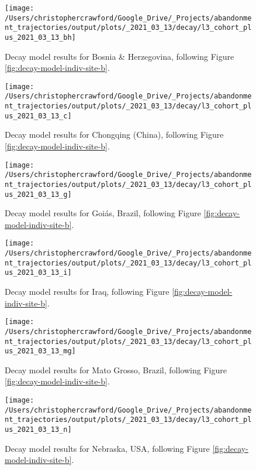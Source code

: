 \documentclass[9pt,twocolumn,twoside,]{pnas-new}
\begin{document}
\begin{figure}
\texttt{[image: /Users/christophercrawford/Google\_Drive/\_Projects/abandonment\_trajectories/output/plots/\_2021\_03\_13/decay/l3\_cohort\_plus\_2021\_03\_13\_bh]} \caption{Decay model results for Bosnia \& Herzegovina, following Figure \ref{fig:decay-model-indiv-site-b}.}\label{fig:decay-model-indiv-site-bh}
\end{figure}

\begin{figure}
\texttt{[image: /Users/christophercrawford/Google\_Drive/\_Projects/abandonment\_trajectories/output/plots/\_2021\_03\_13/decay/l3\_cohort\_plus\_2021\_03\_13\_c]} \caption{Decay model results for Chongqing (China), following Figure \ref{fig:decay-model-indiv-site-b}.}\label{fig:decay-model-indiv-site-c}
\end{figure}

\begin{figure}
\texttt{[image: /Users/christophercrawford/Google\_Drive/\_Projects/abandonment\_trajectories/output/plots/\_2021\_03\_13/decay/l3\_cohort\_plus\_2021\_03\_13\_g]} \caption{Decay model results for Goiás, Brazil, following Figure \ref{fig:decay-model-indiv-site-b}.}\label{fig:decay-model-indiv-site-g}
\end{figure}

\begin{figure}
\texttt{[image: /Users/christophercrawford/Google\_Drive/\_Projects/abandonment\_trajectories/output/plots/\_2021\_03\_13/decay/l3\_cohort\_plus\_2021\_03\_13\_i]} \caption{Decay model results for Iraq, following Figure \ref{fig:decay-model-indiv-site-b}.}\label{fig:decay-model-indiv-site-i}
\end{figure}

\begin{figure}
\texttt{[image: /Users/christophercrawford/Google\_Drive/\_Projects/abandonment\_trajectories/output/plots/\_2021\_03\_13/decay/l3\_cohort\_plus\_2021\_03\_13\_mg]} \caption{Decay model results for Mato Grosso, Brazil, following Figure \ref{fig:decay-model-indiv-site-b}.}\label{fig:decay-model-indiv-site-mg}
\end{figure}

\begin{figure}
\texttt{[image: /Users/christophercrawford/Google\_Drive/\_Projects/abandonment\_trajectories/output/plots/\_2021\_03\_13/decay/l3\_cohort\_plus\_2021\_03\_13\_n]} \caption{Decay model results for Nebraska, USA, following Figure \ref{fig:decay-model-indiv-site-b}.}\label{fig:decay-model-indiv-site-n}
\end{figure}
\end{document}
